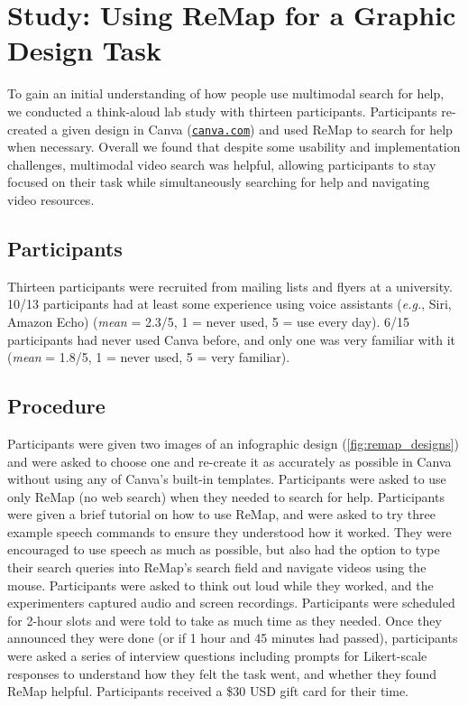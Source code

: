 \section{Study: Using ReMap for a Graphic Design Task}
\label{sec:remap_study}
To gain an initial understanding of how people use multimodal search for help, we conducted a think-aloud lab study with thirteen participants. Participants re-created a given design in Canva (\href{https://canva.com}{\nolinkurl{canva.com}}) and used ReMap to search for help when necessary. Overall we found that despite some usability and implementation challenges, multimodal video search was helpful, allowing participants to stay focused on their task while simultaneously searching for help and navigating video resources. 

\subsection{Participants}
Thirteen participants were recruited from mailing lists and flyers at a university. 10/13 participants had at least some experience using voice assistants (\textit{e.g.}, Siri, Amazon Echo) (\textit{mean} = 2.3/5, 1 = never used, 5 = use every day). 6/15 participants had never used Canva before, and only one was very familiar with it (\textit{mean} = 1.8/5, 1 = never used, 5 = very familiar).

\subsection{Procedure}
Participants were given two images of an infographic design (\autoref{fig:remap_designs}) and were asked to choose one and re-create it as accurately as possible in Canva without using any of Canva's built-in templates. Participants were asked to use only ReMap (no web search) when they needed to search for help. Participants were given a brief tutorial on how to use ReMap, and were asked to try three example speech commands to ensure they understood how it worked. They were encouraged to use speech as much as possible, but also had the option to type their search queries into ReMap's search field and navigate videos using the mouse. Participants were asked to think out loud while they worked, and the experimenters captured audio and screen recordings. Participants were scheduled for 2-hour slots and were told to take as much time as they needed. Once they announced they were done (or if 1 hour and 45 minutes had passed), participants were asked a series of interview questions including prompts for Likert-scale responses to understand how they felt the task went, and whether they found ReMap helpful. Participants received a \$30 USD gift card for their time.

